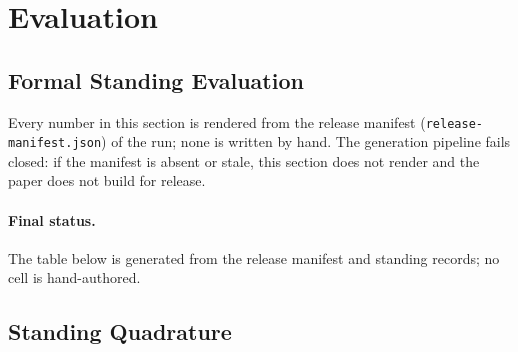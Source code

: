 \documentclass[11pt]{article}
\newif\ifreleasebuild
\begin{document}
\ifreleasebuild
  
\else
\fi

\section{Evaluation}
\label{sec:eval}

\subsection{Formal Standing Evaluation}
\label{sec:formal_eval}

Every number in this section is rendered from the release manifest
(\texttt{release-manifest.json}) of the run; none is written by hand. The
generation pipeline fails closed: if the manifest is absent or stale, this
section does not render and the paper does not build for release.

\ifreleasebuild
  
\else
\fi

\paragraph{Final status.} The table below is generated from the
release manifest and standing records; no cell is hand-authored.
\ifreleasebuild
  
\else
\fi

\subsection{Standing Quadrature}
\label{sec:quadrature}
\end{document}
